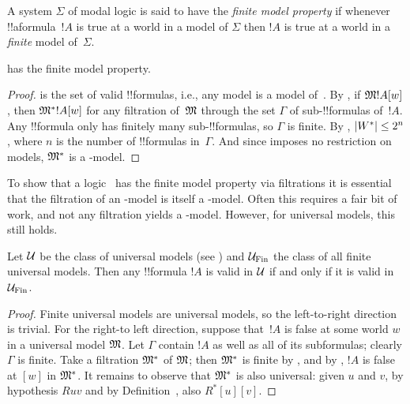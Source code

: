 \documentclass[../../../include/open-logic-section]{subfiles}
\begin{document}


\begin{defn}
  A system $\Sigma$ of modal logic is said to have the \emph{finite
    model property} if whenever !!a{formula}~$!A$ is true at a world
  in a model of $\Sigma$ then $!A$ is true at a world in a
  \emph{finite} model of~$\Sigma$.
\end{defn}

\begin{prop}
   has the finite model property.
\end{prop}

\begin{proof}
   is the set of valid !!{formula}s, i.e., any model is a model
  of~.  By , if
  $\mathfrak M{!A}[w]$, then $\mathfrak M^*{!A}[w]$ for any filtration
  of~$\mathfrak M$ through the set $\Gamma$ of sub-!!{formula}s
  of~$!A$. Any !!{formula} only has finitely many sub-!!{formula}s, so
  $\Gamma$ is finite. By ,
  $\left| W^* \right| \le 2^n$, where $n$ is the number of !!{formula}s
  in~$\Gamma$. And since  imposes no restriction on models,
  $\mathfrak M^*$ is a -model.
\end{proof}

To show that a logic~ has the finite model property via
filtrations it is essential that the filtration of an -model is
itself a -model. Often this requires a fair bit of work, and
not any filtration yields a -model. However, for universal
models, this still holds.

\begin{prop}
  Let $\mathcal{U}$ be the class of universal models (see
  ) and $\mathcal{U}_\mathrm{Fin}$ the
  class of all finite universal models. Then any !!{formula} $!A$ is
  valid in $\mathcal{U}$ if and only if it is valid in
  $\mathcal{U}_\mathrm{Fin}$.
\end{prop}

\begin{proof}
  Finite universal models are universal models, so the left-to-right
  direction is trivial. For the right-to left direction, suppose
  that~$!A$ is false at some world $w$ in a universal model
  $\mathfrak M$. Let $\Gamma$ contain $!A$ as well as all of its
  subformulas; clearly $\Gamma$ is finite. Take a filtration
  $\mathfrak M^*$ of $\mathfrak M$; then $\mathfrak M^*$ is finite by
  , and by
  , $!A$ is false at $[w]$ in
  $\mathfrak M^*$. It remains to observe that $\mathfrak M^*$ is also
  universal: given $u$ and $v$, by hypothesis $Ruv$ and by
  Definition~,
  also $R^*[u][v]$.
\end{proof}
\end{document}
